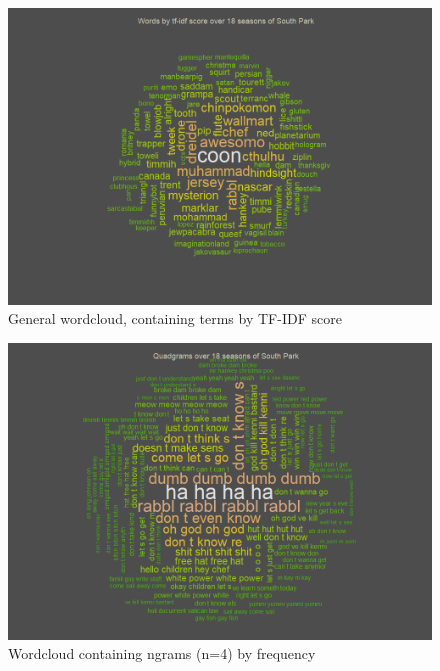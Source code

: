 \documentclass[10pt,a4paper]{article}
\begin{document}
	\begin{figure}[h]
	\centering
	\includegraphics[scale=0.9]{images/WordCloud-TFIDF.png}
	\caption{General wordcloud, containing terms by TF-IDF score}
	\label{fig:WordCloud-TFIDF}
	\end{figure}
	\begin{figure}[h]
	\centering
	\includegraphics[scale=0.9]{images/WordCloud-ngram.png}
	\caption{Wordcloud containing ngrams (n=4) by frequency}
	\label{fig:WordCloud-ngram}
	\end{figure}
	
\end{document}
